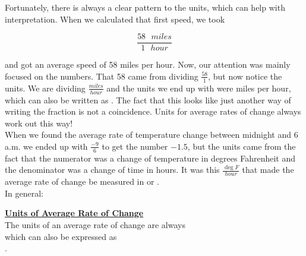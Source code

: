 Fortunately, there is always a clear pattern to the units, which can help with interpretation. When we calculated that first speed, we took

\begin{equation*}
	\frac{58 \text{ } miles}{1 \text{ } hour}
\end{equation*}

and got an average speed of 58 miles per hour. Now, our attention was mainly focused on the numbers. That 58 came from dividing $\frac{58}{1}$, but now notice the units. We are dividing $\frac{miles}{hour}$ and the units we end up with were miles per hour, which can also be written as . The fact that this looks like just another way of writing the fraction is not a coincidence. Units for average rates of change always work out this way!\\

When we found the average rate of temperature change between midnight and 6 a.m. we ended up with $\frac{-9}{6}$ to get the number $-1.5$, but the units  came from the fact that the numerator was a change of temperature in degrees Fahrenheit and the denominator was a change of time in hours.  It was this $\frac{\deg F}{hour}$ that made the average rate of change be measured in  or .\\

In general:

\begin{definition}
	\textbf{\underline{Units of Average Rate of Change}}\\
	\bigskip
	The units of an average rate of change are always \\ 
	which can also be expressed as \\
	.
\end{definition}

\bigskip


